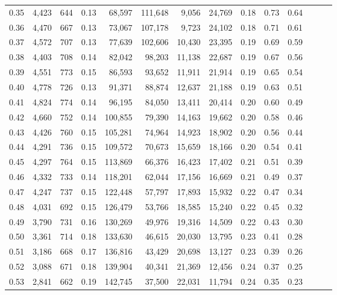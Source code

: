\begin{tabular}{rrrrrrrrrrrrrr}
0.35 &  4,423 &  644 &  0.13 &   68,597 &  111,648 &   9,056 &  24,769 &  0.18 &  0.73 &      0.64 \\
0.36 &  4,470 &  667 &  0.13 &   73,067 &  107,178 &   9,723 &  24,102 &  0.18 &  0.71 &      0.61 \\
0.37 &  4,572 &  707 &  0.13 &   77,639 &  102,606 &  10,430 &  23,395 &  0.19 &  0.69 &      0.59 \\
0.38 &  4,403 &  708 &  0.14 &   82,042 &   98,203 &  11,138 &  22,687 &  0.19 &  0.67 &      0.56 \\
0.39 &  4,551 &  773 &  0.15 &   86,593 &   93,652 &  11,911 &  21,914 &  0.19 &  0.65 &      0.54 \\
0.40 &  4,778 &  726 &  0.13 &   91,371 &   88,874 &  12,637 &  21,188 &  0.19 &  0.63 &      0.51 \\
0.41 &  4,824 &  774 &  0.14 &   96,195 &   84,050 &  13,411 &  20,414 &  0.20 &  0.60 &      0.49 \\
0.42 &  4,660 &  752 &  0.14 &  100,855 &   79,390 &  14,163 &  19,662 &  0.20 &  0.58 &      0.46 \\
0.43 &  4,426 &  760 &  0.15 &  105,281 &   74,964 &  14,923 &  18,902 &  0.20 &  0.56 &      0.44 \\
0.44 &  4,291 &  736 &  0.15 &  109,572 &   70,673 &  15,659 &  18,166 &  0.20 &  0.54 &      0.41 \\
0.45 &  4,297 &  764 &  0.15 &  113,869 &   66,376 &  16,423 &  17,402 &  0.21 &  0.51 &      0.39 \\
0.46 &  4,332 &  733 &  0.14 &  118,201 &   62,044 &  17,156 &  16,669 &  0.21 &  0.49 &      0.37 \\
0.47 &  4,247 &  737 &  0.15 &  122,448 &   57,797 &  17,893 &  15,932 &  0.22 &  0.47 &      0.34 \\
0.48 &  4,031 &  692 &  0.15 &  126,479 &   53,766 &  18,585 &  15,240 &  0.22 &  0.45 &      0.32 \\
0.49 &  3,790 &  731 &  0.16 &  130,269 &   49,976 &  19,316 &  14,509 &  0.22 &  0.43 &      0.30 \\
0.50 &  3,361 &  714 &  0.18 &  133,630 &   46,615 &  20,030 &  13,795 &  0.23 &  0.41 &      0.28 \\
0.51 &  3,186 &  668 &  0.17 &  136,816 &   43,429 &  20,698 &  13,127 &  0.23 &  0.39 &      0.26 \\
0.52 &  3,088 &  671 &  0.18 &  139,904 &   40,341 &  21,369 &  12,456 &  0.24 &  0.37 &      0.25 \\
0.53 &  2,841 &  662 &  0.19 &  142,745 &   37,500 &  22,031 &  11,794 &  0.24 &  0.35 &      0.23 \\

\end{tabular}
